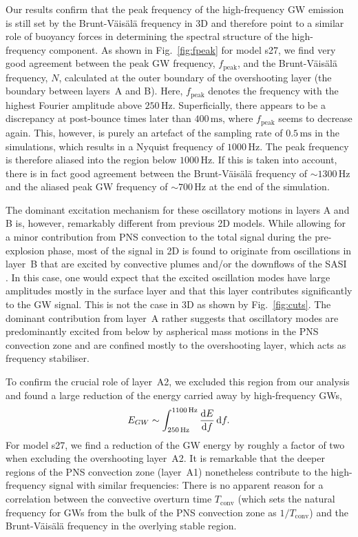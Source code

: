 Our results confirm that the peak frequency of the high-frequency GW emission
is still set by the Brunt-V\"{a}is\"{a}l\"{a} frequency in 3D and therefore point to a
similar role of buoyancy forces in determining the spectral structure
of the high-frequency component. As shown in Fig.~\ref{fig:fpeak} for
model s27, we find very good agreement between the peak GW
frequency, $f_\mathrm{peak}$, and the Brunt-V\"{a}is\"{a}l\"{a}
frequency, $N$, calculated at the outer boundary of the overshooting
layer (the boundary between layers~A and B).
Here, $f_\mathrm{peak}$ denotes the frequency with the highest Fourier amplitude above $250 \, \mathrm{Hz}$.
Superficially, there appears to be a discrepancy at post-bounce times
later than $400 \, \mathrm{ms}$, where $f_\mathrm{peak}$ seems to decrease
again. This, however, is purely an artefact of the
sampling rate of $0.5 \, \mathrm{ms}$ in the simulations, which results
in a Nyquist frequency of $1000 \, \mathrm{Hz}$. The peak frequency is
therefore aliased into the region below $1000 \, \mathrm{Hz}$. If
this is taken into account, there is in fact good agreement between
the Brunt-V\"{a}is\"{a}l\"{a} frequency of $\mathord{\sim} 1300
\, \mathrm{Hz}$ and the aliased peak GW frequency of 
$\mathord{\sim} 700\, \mathrm{Hz}$ at the end of the simulation.

The dominant excitation mechanism for these oscillatory motions in layers A and B is, however,
remarkably different from previous 2D models.
While allowing for a minor contribution from PNS
convection to the total signal during the pre-explosion phase, most of the signal in 2D is
found to originate from oscillations in layer~B that are excited by convective plumes and/or the
downflows of the SASI \citep{marek_08,murphy_09,mueller_13}.
In this case, one would expect that the excited oscillation modes have
large amplitudes mostly in the surface layer and that this layer
contributes significantly to the GW signal. This is not the case in
3D as shown by Fig.~\ref{fig:cuts}.
The dominant contribution from layer~A rather suggests that
oscillatory modes are predominantly excited from below by aspherical mass
motions in the PNS convection zone and are confined mostly to the overshooting layer, which
acts as frequency stabiliser.

To confirm the crucial role of layer~A2, we excluded
this region from our analysis and found a large reduction of the
energy carried away by high-frequency GWs,
\begin{equation}
E_{GW} \sim \int_{250 \, \mathrm{Hz}}^{1100\, \mathrm{Hz}} \frac{\mathrm{d} E}{\mathrm{d} f} \, \mathrm{d} f.
\end{equation}
For model s27, we find a reduction of the GW energy
by roughly a factor of two when excluding the overshooting layer~A2. 
It is
remarkable that the deeper regions of the PNS convection zone (layer~A1)
nonetheless contribute to the high-frequency signal with similar
frequencies: There is no apparent reason for a correlation between the
convective overturn time $T_\mathrm{conv}$ (which sets the natural
frequency for GWs from the bulk of the PNS convection zone as
$1/T_\mathrm{conv}$) and the Brunt-V\"{a}is\"{a}l\"{a} frequency in
the overlying stable region.

